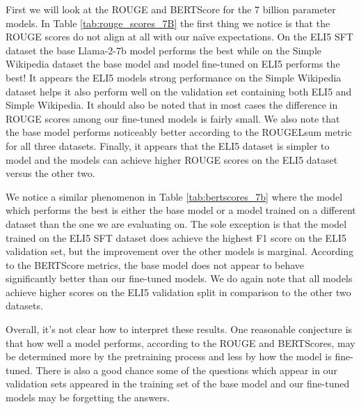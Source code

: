 \documentclass[11pt, oneside]{article}   	%
\begin{document}


First we will look at the ROUGE and BERTScore for the 7 billion parameter models.
In Table \ref{tab:rouge_scores_7B} the first thing we notice is that the ROUGE scores do not align at all with our na\"ive expectations.
On the ELI5 SFT dataset the base Llama-2-7b model performs the best while on the Simple Wikipedia dataset the base model and model fine-tuned on ELI5 performs the best!
It appears the ELI5 models strong performance on the Simple Wikipedia dataset helps it also perform well on the validation set containing both ELI5 and Simple Wikipedia.
It should also be noted that in most cases the difference in ROUGE scores among our fine-tuned models is fairly small.
We also note that the base model performs noticeably better according to the ROUGELsum metric for all three datasets.
Finally, it appears that the ELI5 dataset is simpler to model and the models can achieve higher ROUGE scores on the ELI5 dataset versus the other two.

We notice a similar phenomenon in Table \ref{tab:bertscores_7b} where the model which performs the best is either the base model or a model trained on a different dataset than the one we are evaluating on.
The sole exception is that the model trained on the ELI5 SFT dataset does achieve the highest F1 score on the ELI5 validation set, but the improvement over the other models is marginal.
According to the BERTScore metrics, the base model does not appear to behave significantly better than our fine-tuned models.
We do again note that all models achieve higher scores on the ELI5 validation split in comparison to the other two datasets. 

Overall, it's not clear how to interpret these results.
One reasonable conjecture is that how well a model performs, according to the ROUGE and BERTScores, may be determined more by the pretraining process and less by how the model is fine-tuned.
There is also a good chance some of the questions which appear in our validation sets appeared in the training set of the base model and our fine-tuned models may be forgetting the answers.
\end{document}
